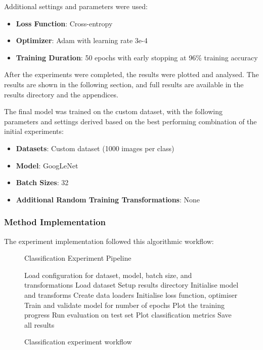 \documentclass[conference]{IEEEtran}
\begin{document}
Additional settings and parameters were used:

\begin{itemize}
    \item \textbf{Loss Function}: Cross-entropy
    \item \textbf{Optimizer}: Adam with learning rate 3e-4
    \item \textbf{Training Duration}: 50 epochs with early stopping at 96\% training accuracy 
\end{itemize}

After the experiments were completed, the results were plotted and analysed. The results are shown in the following section, and full results are available in the results directory
and the appendices.

The final model was trained on the custom dataset, with the following parameters and settings derived based on the best performing combination of the initial experiments:

\begin{itemize}
  \item \textbf{Datasets}: Custom dataset (1000 images per class)
  \item \textbf{Model}: GoogLeNet
  \item \textbf{Batch Sizes}: 32
  \item \textbf{Additional Random Training Transformations}: None
\end{itemize}

\subsubsection{Method Implementation}

The experiment implementation followed this algorithmic workflow:

\begin{figure}[H]
\begin{algorithm}[H]
\caption{Classification Experiment Pipeline}
\begin{algorithmic}[1]
\STATE Load configuration for dataset, model, batch size, and transformations
    \STATE Load dataset
    \STATE Setup results directory
    \STATE Initialise model and transforms
    \STATE Create data loaders
    \STATE Initialise loss function, optimiser
    \STATE Train and validate model for number of epochs
    \STATE Plot the training progress
    \STATE Run evaluation on test set
    \STATE Plot classification metrics
    \STATE Save all results
\ENDFOR
\end{algorithmic}
\end{algorithm}
\caption{Classification experiment workflow}
\end{figure}
\end{document}
